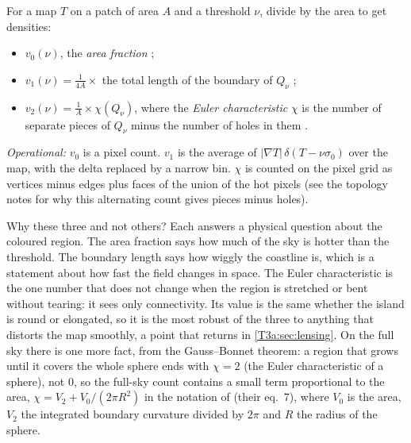 \begin{workdef}
For a map $T$ on a patch of area $A$ and a threshold $\nu$, divide by the area to get densities:
\begin{itemize}[itemsep=1pt,leftmargin=1.2em]
  \item $v_0(\nu)$, the \emph{area fraction} ;
  \item $v_1(\nu)=\frac{1}{4A}\times$ the total length of the boundary of $Q_\nu$ ;
  \item $v_2(\nu)=\frac{1}{A}\times\chi(Q_\nu)$, where the \emph{Euler characteristic} $\chi$ is the number of separate pieces of $Q_\nu$ minus the number of holes in them .
\end{itemize}
\emph{Operational:} $v_0$ is a pixel count. $v_1$ is the average of $|\nabla T|\,\delta(T-\nu\sigma_0)$ over the map, with the delta replaced by a narrow bin. $\chi$ is counted on the pixel grid as vertices minus edges plus faces of the union of the hot pixels (see the topology notes for why this alternating count gives pieces minus holes).
\end{workdef}

Why these three and not others? Each answers a physical question about the coloured region. The area fraction says how much of the sky is hotter than the threshold. The boundary length says how wiggly the coastline is, which is a statement about how fast the field changes in space. The Euler characteristic is the one number that does not change when the region is stretched or bent without tearing: it sees only connectivity. Its value is the same whether the island is round or elongated, so it is the most robust of the three to anything that distorts the map smoothly, a point that returns in \cref{T3a:sec:lensing}. On the full sky there is one more fact, from the Gauss--Bonnet theorem: a region that grows until it covers the whole sphere ends with $\chi=2$ (the Euler characteristic of a sphere), not $0$, so the full-sky count contains a small term proportional to the area, $\chi=V_2+V_0/(2\pi R^2)$ in the notation of \cite{SchmalzingGorski1998} (their eq.~7), where $V_0$ is the area, $V_2$ the integrated boundary curvature divided by $2\pi$ and $R$ the radius of the sphere.


